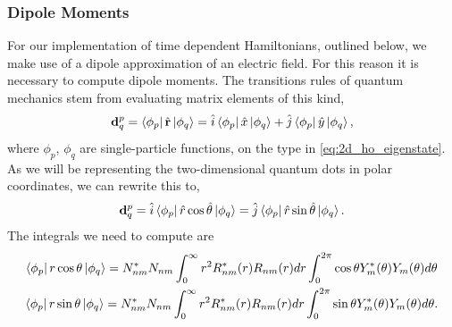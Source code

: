 \subsubsection{Dipole Moments}
For our implementation of time dependent Hamiltonians, outlined below, we make use of 
a dipole approximation of an electric field. For this reason it is necessary to compute 
dipole moments. The transitions rules of quantum mechanics stem from evaluating matrix
elements of this kind,
\begin{equation}
    \vb{d}^p_q = \bra{\phi_p} \hat{\vb{r}} \ket{\phi_q} 
        = \hat{i}\bra{\phi_p} \hat{x} \ket{\phi_q} + \hat{j}  \bra{\phi_p} \hat{y} \ket{\phi_q},
\end{equation}
where $\phi_p$, $\phi_q$ are single-particle functions, on the type in \autoref{eq:2d_ho_eigenstate}.
As we will be representing the two-dimensional quantum dots in polar coordinates,
we can rewrite this to,
\begin{equation}
    \vb{d}^p_q 
        = \hat{i}\bra{\phi_p} \hat{r}\cos{\hat{\theta}}\ket{\phi_q}
        = \hat{j}\bra{\phi_p} \hat{r}\sin{\hat{\theta}}\ket{\phi_q}.
\end{equation}
The integrals we need to compute are
\begin{gather}
    \bra{\phi_p} r \cos\theta \ket{\phi_q} 
        = 
        N_{nm}^* N_{nm} 
        \int_0^\infty r^2 R^*_{nm}(r)R_{nm}(r) dr
        \int_0^{2\pi} \cos\theta Y^*_{m}(\theta)Y_{m}(\theta)d\theta \\
    \bra{\phi_p} r \sin\theta \ket{\phi_q} 
        = 
        N_{nm}^* N_{nm} 
        \int_0^\infty r^2 R^*_{nm}(r)R_{nm}(r) dr
        \int_0^{2\pi} \sin\theta Y^*_{m}(\theta)Y_{m}(\theta)d\theta.
\end{gather}


